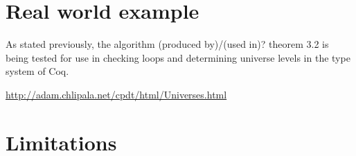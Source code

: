 \section{Real world example}

As stated previously, the algorithm (produced by)/(used in)? theorem 3.2 is being
tested for use in checking loops and determining universe levels in the
type system of Coq.

\url{http://adam.chlipala.net/cpdt/html/Universes.html}

\section{Limitations}
\label{sec:limitations}
